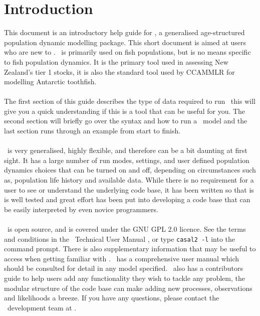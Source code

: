 \section{Introduction}\label{sec:introduction}

This document is an introductory help guide for \CNAME, a generalised age-structured population dynamic modelling package. This short document is aimed at users who are new to \CNAME. \CNAME\ is primarily used on fish populations, but is no means specific to fish population dynamics. It is the primary tool used in assessing New Zealand's tier 1 stocks, it is also the standard tool used by CCAMMLR for modelling Antarctic toothfish. 
\\\\
The first section of this guide describes the type of data required to run \CNAME\ this will give you a quick understanding if this is a tool that can be useful for you. The second section will briefly go over the syntax and how to run a \CNAME\ model and the last section runs through an example from start to finish.
\\\\
\CNAME\ is very generalised, highly flexible, and therefore can be a bit daunting at first sight. It has a large number of run modes, settings, and user defined population dynamics choices that can be turned on and off, depending on circumstances such as, population life history and available data. While there is no requirement for a user to see or understand the underlying code base, it has been written so that is is well tested and great effort has been put into developing a code base that can be easily interpreted by even novice programmers.
\\\\
\CNAME\ is open source, and is covered under the GNU GPL 2.0 licence. See the terms and conditions in the \CNAME\ Technical User Manual \citep{CASAL2}, or type \texttt{casal2 -l} into the command prompt. There is also supplementary information that may be useful to access when getting familiar with \CNAME. \CNAME\ has a comprehensive user manual \citep{CASAL2} which should be consulted for detail in any model specified. \CNAME\ also has a contributors guide to help users add any functionality they wish to tackle any problem, the modular structure of the code base can make adding new processes, observations and likelihoods a breeze. If you have any questions, please contact the \CNAME\ development team at \email.
\\\\

